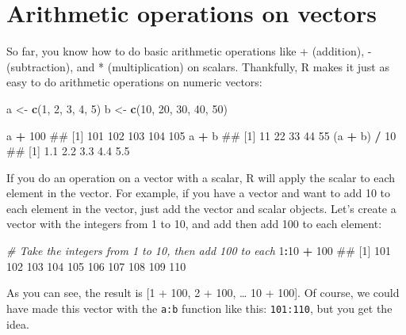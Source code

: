 \documentclass[]{book}
\newenvironment{Shaded}{\begin{snugshade}}{\end{snugshade}}
\newcommand{\KeywordTok}[1]{\textcolor[rgb]{0.13,0.29,0.53}{\textbf{#1}}}
\newcommand{\DecValTok}[1]{\textcolor[rgb]{0.00,0.00,0.81}{#1}}
\newcommand{\StringTok}[1]{\textcolor[rgb]{0.31,0.60,0.02}{#1}}
\newcommand{\CommentTok}[1]{\textcolor[rgb]{0.56,0.35,0.01}{\textit{#1}}}
\newcommand{\OperatorTok}[1]{\textcolor[rgb]{0.81,0.36,0.00}{\textbf{#1}}}
\newcommand{\NormalTok}[1]{#1}
\theoremstyle{definition}
\theoremstyle{definition}
\theoremstyle{remark}
\begin{document}
\section{Arithmetic operations on
vectors}\label{arithmetic-operations-on-vectors}

So far, you know how to do basic arithmetic operations like +
(addition), - (subtraction), and * (multiplication) on scalars.
Thankfully, R makes it just as easy to do arithmetic operations on
numeric vectors:

\begin{Shaded}
\begin{Highlighting}[]
\NormalTok{a <-}\StringTok{ }\KeywordTok{c}\NormalTok{(}\DecValTok{1}\NormalTok{, }\DecValTok{2}\NormalTok{, }\DecValTok{3}\NormalTok{, }\DecValTok{4}\NormalTok{, }\DecValTok{5}\NormalTok{)}
\NormalTok{b <-}\StringTok{ }\KeywordTok{c}\NormalTok{(}\DecValTok{10}\NormalTok{, }\DecValTok{20}\NormalTok{, }\DecValTok{30}\NormalTok{, }\DecValTok{40}\NormalTok{, }\DecValTok{50}\NormalTok{)}

\NormalTok{a }\OperatorTok{+}\StringTok{ }\DecValTok{100}
\NormalTok{## [1] 101 102 103 104 105}
\NormalTok{a }\OperatorTok{+}\StringTok{ }\NormalTok{b}
\NormalTok{## [1] 11 22 33 44 55}
\NormalTok{(a }\OperatorTok{+}\StringTok{ }\NormalTok{b) }\OperatorTok{/}\StringTok{ }\DecValTok{10}
\NormalTok{## [1] 1.1 2.2 3.3 4.4 5.5}
\end{Highlighting}
\end{Shaded}

If you do an operation on a vector with a scalar, R will apply the
scalar to each element in the vector. For example, if you have a vector
and want to add 10 to each element in the vector, just add the vector
and scalar objects. Let's create a vector with the integers from 1 to
10, and add then add 100 to each element:

\begin{Shaded}
\begin{Highlighting}[]
\CommentTok{# Take the integers from 1 to 10, then add 100 to each}
\DecValTok{1}\OperatorTok{:}\DecValTok{10} \OperatorTok{+}\StringTok{ }\DecValTok{100}
\NormalTok{##  [1] 101 102 103 104 105 106 107 108 109 110}
\end{Highlighting}
\end{Shaded}

As you can see, the result is {[}1 + 100, 2 + 100, \ldots{} 10 + 100{]}.
Of course, we could have made this vector with the \texttt{a:b} function
like this: \texttt{101:110}, but you get the idea.
\end{document}

